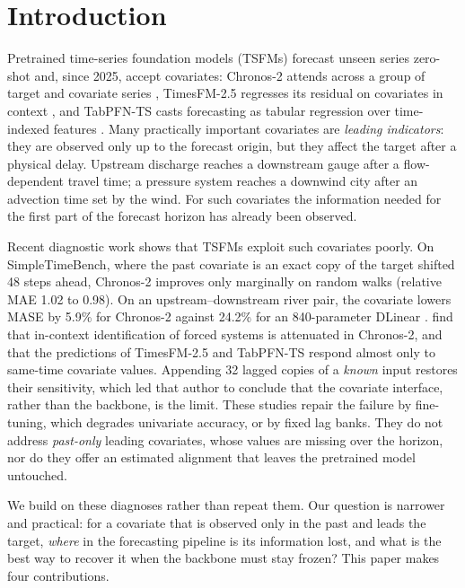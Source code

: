 \documentclass[preprint,11pt,authoryear]{elsarticle}
\begin{document}
\section{Introduction}
\label{sec:intro}

Pretrained time-series foundation models (TSFMs) forecast unseen series zero-shot and, since 2025, accept covariates: Chronos-2 attends across a group of target and covariate series \citep{ansari2025chronos2}, TimesFM-2.5 regresses its residual on covariates in context \citep{das2024timesfm,timesfm_github}, and TabPFN-TS casts forecasting as tabular regression over time-indexed features \citep{hoo2025tabpfnts}. Many practically important covariates are \emph{leading indicators}: they are observed only up to the forecast origin, but they affect the target after a physical delay. Upstream discharge reaches a downstream gauge after a flow-dependent travel time; a pressure system reaches a downwind city after an advection time set by the wind. For such covariates the information needed for the first part of the forecast horizon has already been observed.

Recent diagnostic work shows that TSFMs exploit such covariates poorly. On SimpleTimeBench, where the past covariate is an exact copy of the target shifted 48 steps ahead, Chronos-2 improves only marginally on random walks (relative MAE 1.02 to 0.98). On an upstream--downstream river pair, the covariate lowers MASE by 5.9\% for Chronos-2 against 24.2\% for an 840-parameter DLinear \citep{ghoroghchian2026foundations}. \citet{won2026attenuated} find that in-context identification of forced systems is attenuated in Chronos-2, and that the predictions of TimesFM-2.5 and TabPFN-TS respond almost only to same-time covariate values. Appending 32 lagged copies of a \emph{known} input restores their sensitivity, which led that author to conclude that the covariate interface, rather than the backbone, is the limit. These studies repair the failure by fine-tuning, which degrades univariate accuracy, or by fixed lag banks. They do not address \emph{past-only} leading covariates, whose values are missing over the horizon, nor do they offer an estimated alignment that leaves the pretrained model untouched.

We build on these diagnoses rather than repeat them. Our question is narrower and practical: for a covariate that is observed only in the past and leads the target, \emph{where} in the forecasting pipeline is its information lost, and what is the best way to recover it when the backbone must stay frozen? This paper makes four contributions.
\end{document}
